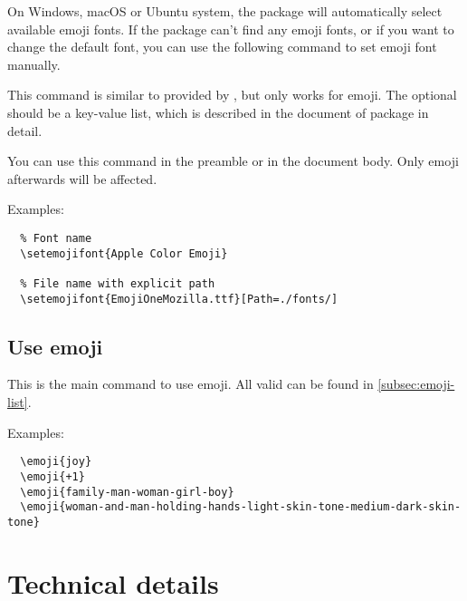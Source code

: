 \documentclass{l3doc}
\newcounter { emoji }
\begin{document}
On Windows, macOS or Ubuntu system, the  package will automatically select available
emoji fonts. If the package can't find any emoji fonts, or if you want to change the default font,
you can use the following command to set emoji font manually.

\begin{function}{\setemojifont}
  \begin{syntax}
  \end{syntax}
  This command is similar to  provided by , but only works for
  emoji. The optional  should be a key-value list, which is described in the
  document of  package in detail.

  You can use this command in the preamble or in the document body. Only emoji afterwards will
  be affected.
\end{function}

Examples:

\begin{verbatim}
  % Font name
  \setemojifont{Apple Color Emoji}

  % File name with explicit path
  \setemojifont{EmojiOneMozilla.ttf}[Path=./fonts/]
\end{verbatim}

\subsection{ Use emoji}

\begin{function}{\emoji}
  \begin{syntax}
  \end{syntax}
  This is the main command to use emoji. All valid  can be found in
  \autoref{subsec:emoji-list}.
\end{function}

Examples:

\begin{verbatim}
  \emoji{joy}
  \emoji{+1}
  \emoji{family-man-woman-girl-boy}
  \emoji{woman-and-man-holding-hands-light-skin-tone-medium-dark-skin-tone}
\end{verbatim}

  

\section{ Technical details}
\end{document}

